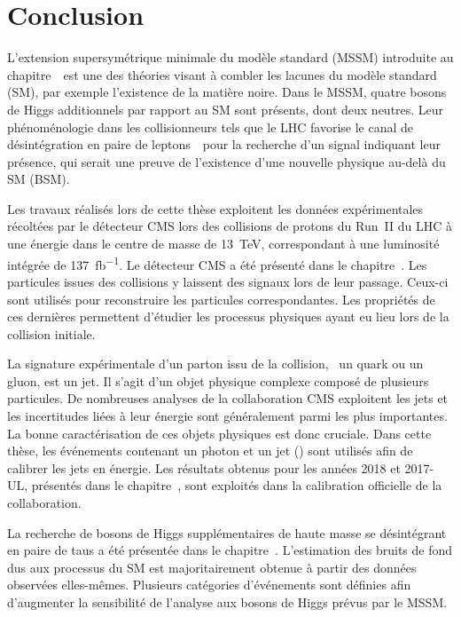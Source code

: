 \chapter*{Conclusion}\label{chapter-conclusion}

L'extension supersymétrique minimale du modèle standard (MSSM)
introduite au chapitre~\
est une des théories visant à combler les lacunes du modèle standard (SM),
par exemple l'existence de la matière noire.
Dans le MSSM,
quatre bosons de Higgs additionnels par rapport au SM sont présents,
dont deux neutres.
Leur phénoménologie dans les collisionneurs tels que le LHC
favorise le canal de désintégration en paire de leptons~\tau\
pour la recherche d'un signal indiquant leur présence,
qui serait une preuve de l'existence d'une nouvelle physique
au-delà du SM (BSM).
\par
Les travaux réalisés lors de cette thèse
exploitent les données expérimentales
récoltées par le détecteur CMS
lors des collisions de protons du Run~II du LHC
à une énergie dans le centre de masse de \SI{13}{\TeV},
correspondant à une luminosité intégrée de \SI{137}{\femto\barn^{-1}}.
Le détecteur CMS a été présenté dans le chapitre~.
Les particules issues des collisions y laissent des signaux lors de leur passage.
Ceux-ci sont utilisés pour reconstruire les particules correspondantes.
Les propriétés de ces dernières permettent d'étudier les processus physiques
ayant eu lieu lors de la collision initiale.
\par
La signature expérimentale
d'un parton issu de la collision, \ie\ un quark ou un gluon,
est un jet.
Il s'agit d'un objet physique complexe
composé de plusieurs particules.
De nombreuses analyses de la collaboration CMS exploitent les jets
et
les incertitudes liées à leur énergie sont généralement parmi les plus importantes.
La bonne caractérisation de ces objets physiques est donc cruciale.
Dans cette thèse,
les événements contenant un photon et un jet (\Gjet)
sont utilisés afin de calibrer les jets en énergie.
Les résultats obtenus pour les années 2018 et 2017-UL,
présentés dans le chapitre~\refChJERC,
sont exploités dans la calibration officielle de la collaboration.
\par
La recherche de bosons de Higgs supplémentaires de haute masse se désintégrant en paire de taus
a été présentée dans le chapitre~.
L'estimation des bruits de fond dus aux processus du SM
est majoritairement obtenue à partir des données observées elles-mêmes.
Plusieurs catégories d'événements sont définies afin d'augmenter la sensibilité de l'analyse aux bosons de Higgs prévus par le MSSM.
